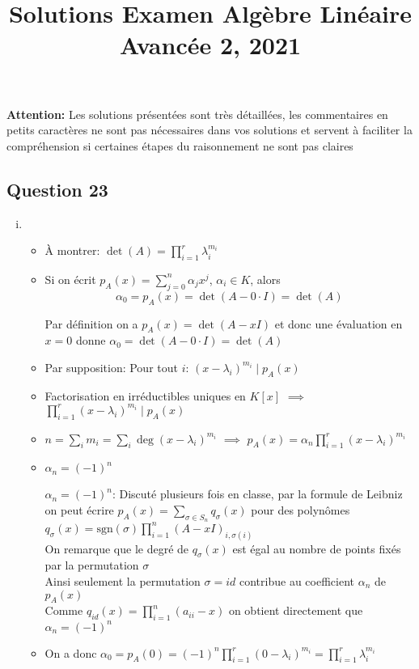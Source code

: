 \documentclass[11pt, a4paper, oneside]{article}
\newcommand{\indice}[1]{{\scriptsize \color{RubineRed} {#1}}}
\begin{document}
\title{Solutions Examen Algèbre Linéaire Avancée 2, 2021}
\maketitle

\noindent 
\textbf{Attention:} Les solutions présentées sont très détaillées, les commentaires en \indice{ petits caractères} ne sont pas  nécessaires dans vos solutions et servent à faciliter la compréhension si certaines étapes du raisonnement ne sont pas claires


\subsection*{Question 23}
\begin{enumerate}[i)] 
\item
  \begin{itemize}
  \item À montrer:  $\det(A) = \prod_{i=1}^r \lambda_i^{m_i}$
  \item   Si on écrit $p_A(x) = \sum_{j=0}^n \alpha_jx^j$, $α_i ∈K$, alors
    \begin{displaymath}
      \alpha_0 = p_A(x) = \det(A-0\cdot I) = \det(A)
    \end{displaymath}
    
\indice{Par définition on a $p_A(x) = \det(A-xI)$ et donc une évaluation en $x=0$ donne $\alpha_0 = \det(A-0\cdot I) = \det(A)$}  
\item Par supposition: Pour tout $i$:  $(x- λ_i)^{m_i} \mid p_A(x)$
\item Factorisation en irréductibles uniques en $K[x]$ $⟹$   $ \prod_{i=1}^r (x-\lambda_i)^{m_i} \mid p_A(x) $  
\item $n = ∑_i m_i =  ∑_i \deg(x- λ_i)^{m_i} $  $⟹$ $p_A(x) = \alpha_n \prod_{i=1}^r (x-\lambda_i)^{m_i}$ 
\item $α_n = (-1)^n$
  
\indice{$\alpha_n = (-1)^n$: Discuté plusieurs fois en classe, par la formule de Leibniz on peut écrire $p_A(x) = \sum_{\sigma \in S_n} q_{\sigma}(x)$ pour des polynômes $q_{\sigma}(x) = \text{sgn}(\sigma)\prod_{i=1}^n(A-xI)_{i,\sigma(i)}$ \\
On remarque que le degré de $q_{\sigma}(x)$ est égal au nombre de points fixés par la permutation $\sigma$ \\
Ainsi seulement la permutation $\sigma = id$ contribue au coefficient $\alpha_n$ de $p_A(x)$ \\
Comme $q_{id}(x) = \prod_{i=1}^n(a_{ii}-x)$ on obtient directement que $\alpha_n = (-1)^n$}
\item On a donc $α_0 = p_A(0) = (-1)^n \prod_{i=1}^r (0-\lambda_i)^{m_i} = \prod_{i=1}^r \lambda_i^{m_i}$   \\


\end{itemize}
\end{enumerate}
\end{document}
